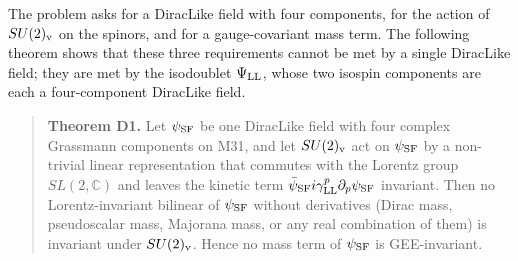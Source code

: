 \documentclass[
  10pt,
]{article}
\begin{document}
The problem asks for a DiracLike field with four components, for the
action of \(SU(2)_{\rm v}\) on the spinors, and for a gauge-covariant
mass term. The following theorem shows that these three requirements
cannot be met by a single DiracLike field; they are met by the
isodoublet \(\Psi_{\rm LL}\), whose two isospin components are each a
four-component DiracLike field.

\begin{quote}
\textbf{Theorem D1.} Let \(\psi_{\rm SF}\) be one DiracLike field with
four complex Grassmann components on M31, and let \(SU(2)_{\rm v}\) act
on \(\psi_{\rm SF}\) by a non-trivial linear representation that
commutes with the Lorentz group \(SL(2,\mathbb C)\) and leaves the
kinetic term
\(\bar\psi_{\rm SF}i\gamma^p_{\rm LL}\partial_p\psi_{\rm SF}\)
invariant. Then no Lorentz-invariant bilinear of \(\psi_{\rm SF}\)
without derivatives (Dirac mass, pseudoscalar mass, Majorana mass, or
any real combination of them) is invariant under \(SU(2)_{\rm v}\).
Hence no mass term of \(\psi_{\rm SF}\) is GEE-invariant.
\end{quote}
\end{document}
